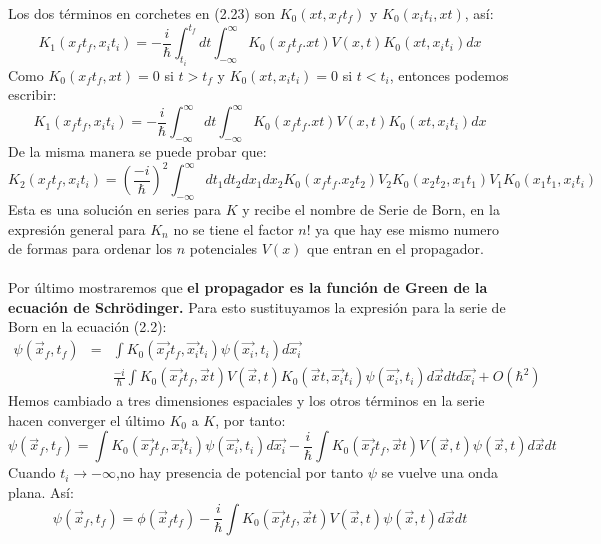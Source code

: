 Los dos términos en corchetes en (2.23) son $K_0(xt,x_ft_f)$ y $K_0(x_it_i,xt)$, así:
\begin{equation}
K_1(x_ft_f,x_it_i)= -\frac{i}{\hbar}\int_{t_{i}}^{t_{f}}dt\int_{-\infty}^{\infty}K_{0}(x_{f}t_{f}.xt)V(x,t)K_{0}(xt,x_{i}t_{i})dx
\end{equation}
Como $K_0(x_ft_f,xt)=0$ si $t>t_f$ y $K_0(xt,x_it_i)=0$ si $t<t_i$, entonces podemos escribir:
\begin{equation}
K_1(x_ft_f,x_it_i)=-\frac{i}{\hbar}\int_{-\infty}^{\infty}dt\int_{-\infty}^{\infty}K_{0}(x_{f}t_{f}.xt)V(x,t)K_{0}(xt,x_{i}t_{i})dx 
\end{equation}
De la misma manera se puede probar que:
\begin{equation}
K_2(x_ft_f,x_it_i)=\left(\frac{-i}{\hbar}\right)^2\int_{-\infty}^{\infty}dt_{1}dt_{2}dx_{1}dx_{2}K_{0}(x_{f}t_{f}.x_{2}t_{2})V_2K_{0}(x_{2}t_{2},x_{1}t_{1})V_1K_{0}(x_{1}t_{1},x_{i}t_{i})
\end{equation}
Esta es una solución en series para $K$ y recibe el nombre de Serie de Born, en la expresión general para $K_n$ no se tiene el factor $n!$ ya que hay ese mismo numero de formas para ordenar los $n$ potenciales $V(x)$ que entran en el propagador.
\\
\\
Por último mostraremos que \textbf{el propagador es la función de Green de la ecuación de Schrödinger.} Para esto sustituyamos la expresión para la serie de Born en la ecuación (2.2):
\begin{eqnarray}
\nonumber \psi(\vec{x}_f,t_f)&=&\int K_{0}(\vec{x_{f}}t_{f},\vec{x_{i}}t_{i})\psi(\vec{x_{i}},t_{i})d\vec{x_{i}}\\
& & \frac{-i}{\hbar}\int K_{0}(\vec{x_{f}}t_{f},\vec{x}t)V(\vec{x},t)K_{0}(\vec{x}t,\vec{x_{i}}t_{i})\psi(\vec{x_{i}},t_{i})d\vec{x}dtd\vec{x_{i}}+O(\hbar^{2})
\end{eqnarray}
Hemos cambiado a tres dimensiones espaciales y los otros términos en la serie hacen converger el último $K_0$ a $K$, por tanto:
\begin{equation}
\psi(\vec{x}_f,t_f)=\int K_{0}(\vec{x_{f}}t_{f},\vec{x_{i}}t_{i})\psi(\vec{x_{i}},t_{i})d\vec{x_{i}}-\frac{i}{\hbar}\int K_{0}(\vec{x_{f}}t_{f},\vec{x}t)V(\vec{x},t)\psi(\vec{x},t)d\vec{x}dt
\end{equation}
Cuando $t_i \to -\infty$,no hay presencia de potencial por tanto $\psi$ se vuelve una onda plana. Así:
\begin{equation}
\psi(\vec{x}_f,t_f)=\phi(\vec{x}_ft_f)-\frac{i}{\hbar}\int K_{0}(\vec{x_{f}}t_{f},\vec{x}t)V(\vec{x},t)\psi(\vec{x},t)d\vec{x}dt
\end{equation}
